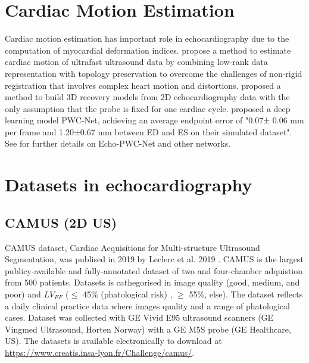 \section{Cardiac Motion Estimation}
Cardiac motion estimation has important role in echocardiography due to the computation of myocardial deformation indices. 
\cite{aviles2017} propose a method to estimate cardiac motion of ultrafast ultrasound data by combining low-rank data representation with topology preservation to
overcome the challenges of non-rigid registration that involves complex heart motion and distortions.
\cite{ahn2022} proposed a method to build 3D recovery models from 2D echocardiography data with the only assumption that the probe is fixed for one cardiac cycle.
\cite{evain2022-medimag-ieee} proposed a deep learning model PWC-Net, achieving an average endpoint error of 
"0.07± 0.06 mm per frame and 1.20±0.67 mm between ED and ES on their simulated dataset".
See \cite{ostvik2021-TMI} for further details on Echo-PWC-Net and other networks. 

\section{Datasets in echocardiography}


\subsection{CAMUS (2D US)}
CAMUS dataset, Cardiac Acquisitions for Multi-structure Ultrasound Segmentation, was publised in 2019 by Leclerc et al. 2019 \cite{leclerc2019-IEEETransMedicalImaging}.
CAMUS is the largest publicy-available and fully-annotated dataset of two and four-chamber adquistion from 500 patients.
Datasets is cathegorised in image quality (good, medium, and poor) and $LV_{EF}$ ($\leq$ 45\% (phatological risk) , $\geq$ 55\%, else).
The dataset reflects a daily clinical practice data where images quality and a range of phatological cases.
Dataset was collected with GE Vivid E95 ultrasound scanners (GE Vingmed Ultrasound, Horten Norway) with a GE M5S probe (GE Healthcare, US).
The datasets is available electronically to download at \url{https://www.creatis.insa-lyon.fr/Challenge/camus/}.


